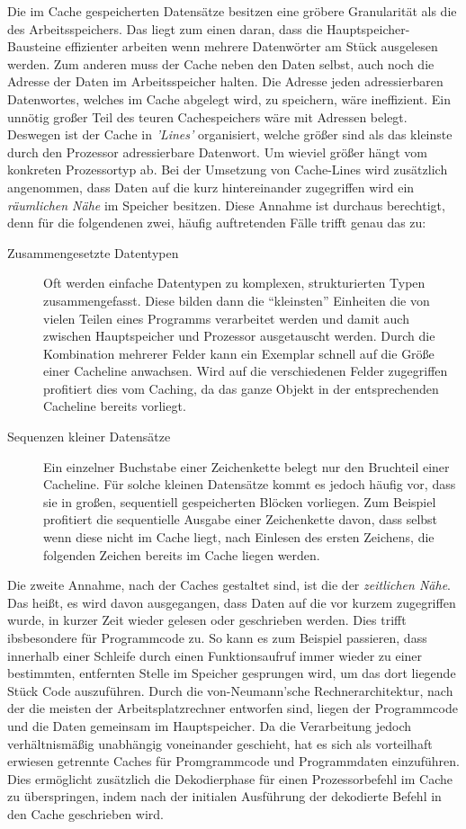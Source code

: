 Die im Cache gespeicherten Datensätze besitzen eine gröbere Granularität als die des Arbeitsspeichers. Das liegt zum einen daran, dass die Hauptspeicher-Bausteine effizienter arbeiten wenn mehrere Datenwörter am Stück ausgelesen werden. Zum anderen muss der Cache neben den Daten selbst, auch noch die Adresse der Daten im Arbeitsspeicher halten. Die Adresse jeden adressierbaren Datenwortes, welches im Cache abgelegt wird, zu speichern, wäre ineffizient. Ein unnötig großer Teil des teuren Cachespeichers wäre mit Adressen belegt.
Deswegen ist der Cache in \textit{'Lines'} organisiert, welche größer sind als das kleinste durch den Prozessor adressierbare Datenwort. Um wieviel größer hängt vom konkreten Prozessortyp ab.
Bei der Umsetzung von Cache-Lines wird zusätzlich angenommen, dass Daten auf die kurz hintereinander zugegriffen wird ein \textit{räumlichen Nähe} im Speicher besitzen. Diese Annahme ist durchaus berechtigt, denn für die folgendenen zwei, häufig auftretenden Fälle trifft genau das zu:
\begin{description}
 \item[Zusammengesetzte Datentypen]Oft werden einfache Datentypen zu komplexen, strukturierten Typen zusammengefasst. Diese bilden dann die ``kleinsten'' Einheiten die von vielen Teilen eines Programms verarbeitet werden und damit auch zwischen Hauptspeicher und Prozessor ausgetauscht werden. Durch die Kombination mehrerer Felder kann ein Exemplar schnell auf die Größe einer Cacheline anwachsen. Wird auf die verschiedenen Felder zugegriffen profitiert dies vom Caching, da das ganze Objekt in der entsprechenden Cacheline bereits vorliegt.
 \item[Sequenzen kleiner Datensätze]Ein einzelner Buchstabe einer Zeichenkette belegt nur den Bruchteil einer Cacheline. Für solche kleinen Datensätze kommt es jedoch häufig vor, dass sie in großen, sequentiell gespeicherten Blöcken vorliegen. Zum Beispiel profitiert die sequentielle Ausgabe einer Zeichenkette davon, dass selbst wenn diese nicht im Cache liegt, nach Einlesen des ersten Zeichens, die folgenden Zeichen bereits im Cache liegen werden.
 \end{description}

Die zweite Annahme, nach der Caches gestaltet sind, ist die der \textit{zeitlichen Nähe}. Das heißt, es wird davon ausgegangen, dass Daten auf die vor kurzem zugegriffen wurde, in kurzer Zeit wieder gelesen oder geschrieben werden. Dies trifft ibsbesondere für Programmcode zu. So kann es zum Beispiel passieren, dass innerhalb einer Schleife durch einen Funktionsaufruf immer wieder zu einer bestimmten, entfernten Stelle im Speicher gesprungen wird, um das dort liegende Stück Code auszuführen.
Durch die von-Neumann'sche Rechnerarchitektur, nach der die meisten der Arbeitsplatzrechner entworfen sind, liegen der Programmcode und die Daten gemeinsam im Hauptspeicher. Da die Verarbeitung jedoch verhältnismäßig unabhängig voneinander geschieht, hat es sich als vorteilhaft erwiesen getrennte Caches für Promgrammcode und Programmdaten einzuführen. Dies ermöglicht zusätzlich die Dekodierphase für einen Prozessorbefehl im Cache zu überspringen, indem nach der initialen Ausführung der dekodierte Befehl in den Cache geschrieben wird. \citep{Drepper07}

